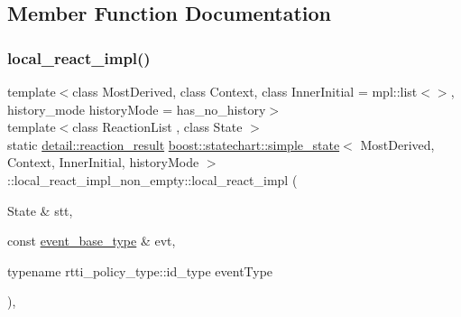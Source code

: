 \subsection{Member Function Documentation}
\mbox{\label{structboost_1_1statechart_1_1simple__state_1_1local__react__impl__non__empty_aca7a8dae81c5f8d27405d1c267d9556f}} 
\subsubsection{\texorpdfstring{local\+\_\+react\+\_\+impl()}{local\_react\_impl()}}
{\footnotesize\ttfamily template$<$class Most\+Derived, class Context, class Inner\+Initial = mpl\+::list$<$$>$, history\+\_\+mode history\+Mode = has\+\_\+no\+\_\+history$>$ \\
template$<$class Reaction\+List , class State $>$ \\
static \mbox{\hyperlink{namespaceboost_1_1statechart_1_1detail_ab091bbb4c29327fb46ee479ea1b7255b}{detail\+::reaction\+\_\+result}} \mbox{\hyperlink{classboost_1_1statechart_1_1simple__state}{boost\+::statechart\+::simple\+\_\+state}}$<$ Most\+Derived, Context, Inner\+Initial, history\+Mode $>$\+::local\+\_\+react\+\_\+impl\+\_\+non\+\_\+empty\+::local\+\_\+react\+\_\+impl (\begin{DoxyParamCaption}\item[{State \&}]{stt,  }\item[{const \mbox{\hyperlink{classboost_1_1statechart_1_1simple__state_a153e115715f5d828021a273ce282ba9b}{event\+\_\+base\+\_\+type}} \&}]{evt,  }\item[{typename rtti\+\_\+policy\+\_\+type\+::id\+\_\+type}]{event\+Type }\end{DoxyParamCaption})\hspace{0.3cm}{\ttfamily [inline]}, {\ttfamily [static]}}

